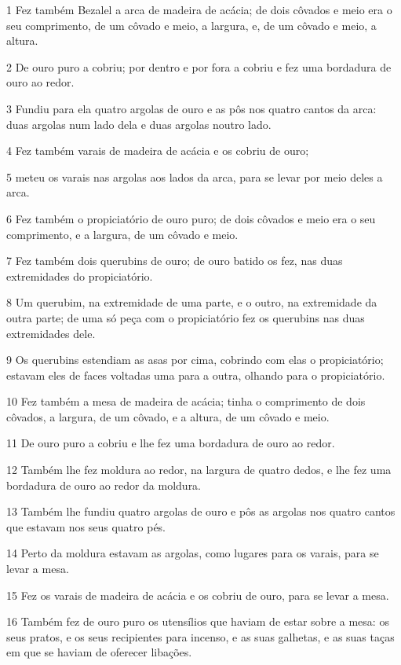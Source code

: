 \par 1 Fez também Bezalel a arca de madeira de acácia; de dois côvados e meio era o seu comprimento, de um côvado e meio, a largura, e, de um côvado e meio, a altura.
\par 2 De ouro puro a cobriu; por dentro e por fora a cobriu e fez uma bordadura de ouro ao redor.
\par 3 Fundiu para ela quatro argolas de ouro e as pôs nos quatro cantos da arca: duas argolas num lado dela e duas argolas noutro lado.
\par 4 Fez também varais de madeira de acácia e os cobriu de ouro;
\par 5 meteu os varais nas argolas aos lados da arca, para se levar por meio deles a arca.
\par 6 Fez também o propiciatório de ouro puro; de dois côvados e meio era o seu comprimento, e a largura, de um côvado e meio.
\par 7 Fez também dois querubins de ouro; de ouro batido os fez, nas duas extremidades do propiciatório.
\par 8 Um querubim, na extremidade de uma parte, e o outro, na extremidade da outra parte; de uma só peça com o propiciatório fez os querubins nas duas extremidades dele.
\par 9 Os querubins estendiam as asas por cima, cobrindo com elas o propiciatório; estavam eles de faces voltadas uma para a outra, olhando para o propiciatório.
\par 10 Fez também a mesa de madeira de acácia; tinha o comprimento de dois côvados, a largura, de um côvado, e a altura, de um côvado e meio.
\par 11 De ouro puro a cobriu e lhe fez uma bordadura de ouro ao redor.
\par 12 Também lhe fez moldura ao redor, na largura de quatro dedos, e lhe fez uma bordadura de ouro ao redor da moldura.
\par 13 Também lhe fundiu quatro argolas de ouro e pôs as argolas nos quatro cantos que estavam nos seus quatro pés.
\par 14 Perto da moldura estavam as argolas, como lugares para os varais, para se levar a mesa.
\par 15 Fez os varais de madeira de acácia e os cobriu de ouro, para se levar a mesa.
\par 16 Também fez de ouro puro os utensílios que haviam de estar sobre a mesa: os seus pratos, e os seus recipientes para incenso, e as suas galhetas, e as suas taças em que se haviam de oferecer libações.

